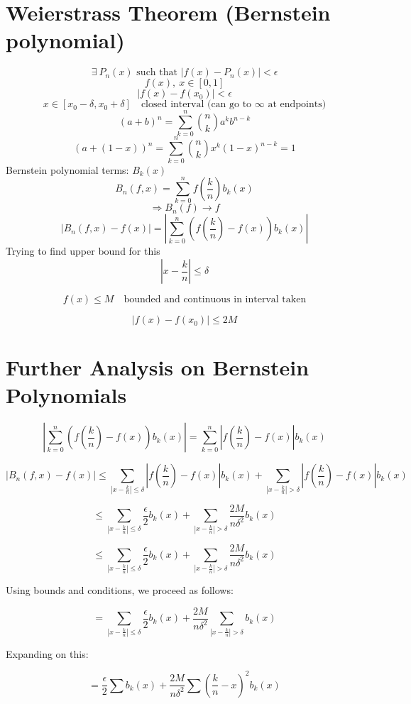 \documentclass[12pt]{report} %
\begin{document}
\section*{Weierstrass Theorem (Bernstein polynomial)}

\[
\exists \ P_n(x) \text{ such that } |f(x) - P_n(x)| < \epsilon
\]
\[
f(x), \ x \in [0, 1]
\]
\[
|f(x) - f(x_0)| < \epsilon
\]
\[
x \in [x_0 - \delta, x_0 + \delta] \quad \text{closed interval (can go to $\infty$ at endpoints)}
\]
\[
(a + b)^n = \sum_{k=0}^{n} \binom{n}{k} a^{k} b^{n-k}
\]
\[
(a + (1 - x))^n = \sum_{k=0}^{n} \binom{n}{k} x^k (1 - x)^{n-k} = 1
\]
Bernstein polynomial terms: $B_k(x)$
\[
B_n(f, x) = \sum_{k=0}^{n} f\left( \frac{k}{n} \right) b_k(x)
\]
\[
\Rightarrow B_n(f) \to f
\]
\[
\left| B_n(f, x) - f(x) \right| = \left| \sum_{k=0}^{n} \left( f\left( \frac{k}{n} \right) - f(x) \right) b_k(x) \right|
\]
Trying to find upper bound for this
\[
|x - \frac{k}{n}| \leq \delta
\]

\[
f(x) \leq M \quad \text{bounded and continuous in interval taken}
\]

\[
|f(x) - f(x_0)| \leq 2M
\]
\section*{Further Analysis on Bernstein Polynomials}

\[
\left| \sum_{k=0}^{n} \left( f\left( \frac{k}{n} \right) - f(x) \right) b_k(x) \right| = \sum_{k=0}^{n} \left| f\left( \frac{k}{n} \right) - f(x) \right| b_k(x)
\]

\[
|B_n(f, x) - f(x)| \leq \sum_{|x - \frac{k}{n}| \leq \delta} \left| f\left( \frac{k}{n} \right) - f(x) \right| b_k(x) + \sum_{|x - \frac{k}{n}| > \delta} \left| f\left( \frac{k}{n} \right) - f(x) \right| b_k(x)
\]

\[
\leq \sum_{|x - \frac{k}{n}| \leq \delta} \frac{\epsilon}{2} b_k(x) + \sum_{|x - \frac{k}{n}| > \delta} \frac{2M}{n \delta^2} b_k(x)
\]

\[
\leq \sum_{|x - \frac{k}{n}| \leq \delta} \frac{\epsilon}{2} b_k(x) + \sum_{|x - \frac{k}{n}| > \delta} \frac{2M}{n \delta^2} b_k(x)
\]

Using bounds and conditions, we proceed as follows:

\[
= \sum_{|x - \frac{k}{n}| \leq \delta} \frac{\epsilon}{2} b_k(x) + \frac{2M}{n \delta^2} \sum_{|x - \frac{k}{n}| > \delta} b_k(x)
\]

Expanding on this:

\[
= \frac{\epsilon}{2} \sum b_k(x) + \frac{2M}{n \delta^2} \sum \left( \frac{k}{n} - x \right)^2 b_k(x)
\]
\end{document}
